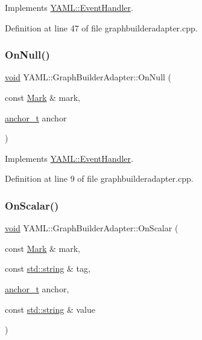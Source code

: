 Implements \mbox{\hyperlink{class_y_a_m_l_1_1_event_handler_a57fc2477cb1f4fd3a650e41180e6f9b6}{Y\+A\+M\+L\+::\+Event\+Handler}}.



Definition at line 47 of file graphbuilderadapter.\+cpp.

\mbox{\label{class_y_a_m_l_1_1_graph_builder_adapter_adeacb6c59aabf0622af8ed3808de9ab9}} 
\subsubsection{\texorpdfstring{OnNull()}{OnNull()}}
{\footnotesize\ttfamily \mbox{\hyperlink{glad_8h_a950fc91edb4504f62f1c577bf4727c29}{void}} Y\+A\+M\+L\+::\+Graph\+Builder\+Adapter\+::\+On\+Null (\begin{DoxyParamCaption}\item[{const \mbox{\hyperlink{struct_y_a_m_l_1_1_mark}{Mark}} \&}]{mark,  }\item[{\mbox{\hyperlink{namespace_y_a_m_l_abeff1798814ae3402fc5665fdcad1de6}{anchor\+\_\+t}}}]{anchor }\end{DoxyParamCaption})\hspace{0.3cm}{\ttfamily [virtual]}}



Implements \mbox{\hyperlink{class_y_a_m_l_1_1_event_handler_aca632ae43f71b6c4f13252d15191f380}{Y\+A\+M\+L\+::\+Event\+Handler}}.



Definition at line 9 of file graphbuilderadapter.\+cpp.

\mbox{\label{class_y_a_m_l_1_1_graph_builder_adapter_a74fffb942e64a1b6576368a49089c5a4}} 
\subsubsection{\texorpdfstring{OnScalar()}{OnScalar()}}
{\footnotesize\ttfamily \mbox{\hyperlink{glad_8h_a950fc91edb4504f62f1c577bf4727c29}{void}} Y\+A\+M\+L\+::\+Graph\+Builder\+Adapter\+::\+On\+Scalar (\begin{DoxyParamCaption}\item[{const \mbox{\hyperlink{struct_y_a_m_l_1_1_mark}{Mark}} \&}]{mark,  }\item[{const \mbox{\hyperlink{glad_8h_ac83513893df92266f79a515488701770}{std\+::string}} \&}]{tag,  }\item[{\mbox{\hyperlink{namespace_y_a_m_l_abeff1798814ae3402fc5665fdcad1de6}{anchor\+\_\+t}}}]{anchor,  }\item[{const \mbox{\hyperlink{glad_8h_ac83513893df92266f79a515488701770}{std\+::string}} \&}]{value }\end{DoxyParamCaption})\hspace{0.3cm}{\ttfamily [virtual]}}



